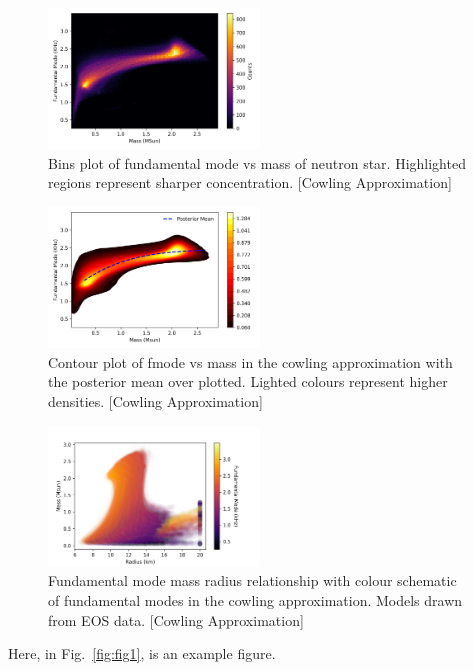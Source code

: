 \documentclass[aps,prd,twocolumn,superscriptaddress,footinbib]{revtex4-1}
\begin{document}
\begin{figure}[h]
\includegraphics[width=0.5\textwidth]{utkarsh_images/fmode_bins.png}
\caption{\label{fig:5} Bins plot of fundamental mode vs mass of neutron star. Highlighted regions represent sharper concentration. [Cowling Approximation]}
\end{figure}
\begin{figure}[h]
\includegraphics[width=0.5\textwidth]{utkarsh_images/fmode_contour.png}
\caption{\label{fig:6} Contour plot of fmode vs mass in the cowling approximation with the posterior mean over plotted. Lighted colours represent higher densities. [Cowling Approximation]} 
\end{figure}
\begin{figure}[h]
\includegraphics[width=0.5\textwidth]{utkarsh_images/fmode_MR.png}
\caption{\label{fig:7} Fundamental mode mass radius relationship with colour schematic of fundamental modes in the cowling approximation. Models drawn from EOS data. [Cowling Approximation]}
\end{figure}

Here, in Fig.~\ref{fig:fig1}, is an example figure.
\end{document}
